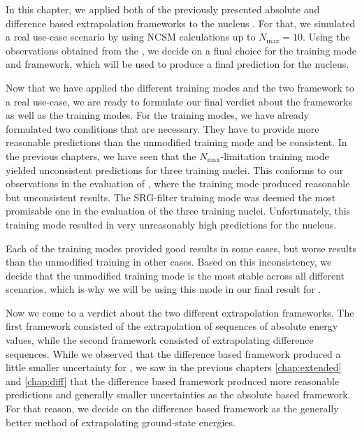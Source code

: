 In this chapter, we applied both of the previously presented absolute and difference based extrapolation frameworks to the nucleus . For that, we simulated a real use-case scenario by using NCSM calculations up to $N_\mathrm{max} = 10$. Using the observations obtained from the , we decide on a final choice for the training mode and framework, which will be used to produce a final prediction for the  nucleus.

Now that we have applied the different training modes and the two framework to a real use-case, we are ready to formulate our final verdict about the frameworks as well as the training modes. For the training modes, we have already formulated two conditions that are necessary. They have to provide more reasonable predictions than the unmodified training mode and be consistent. In the previous chapters, we have seen that the $N_\mathrm{max}$-limitation training mode yielded unconsistent predictions for three training nuclei. This conforms to our observations in the evaluation of , where the training mode produced reasonable but unconsistent results. The SRG-filter training mode was deemed the most promisable one in the evaluation of the three training nuclei. Unfortunately, this training mode resulted in very unreasonably high predictions for the  nucleus.

Each of the training modes provided good results in some cases, but worse results than the unmodified training in other cases. Based on this inconsistency, we decide that the unmodified training mode is the most stable across all different scenarios, which is why we will be using this mode in our final result for .

Now we come to a verdict about the two different extrapolation frameworks. The first framework consisted of the extrapolation of sequences of absolute energy values, while the second framework consisted of extrapolating difference sequences. While we observed that the difference based framework produced a little smaller uncertainty for , we saw in the previous chapters \autoref{chap:extended} and \autoref{chap:diff} that the difference based framework produced more reasonable predictions and generally smaller uncertainties as the absolute based framework. For that reason, we decide on the difference based framework as the generally better method of extrapolating ground-state energies.

